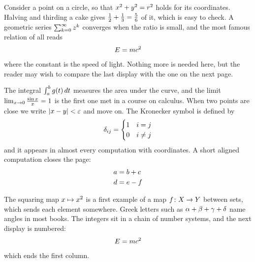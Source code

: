 \documentclass{article}
\newcommand*\pdfcraftbegin[1]{\special{pdfcraft:eq:#1:begin}}
\newcommand*\pdfcraftend[1]{\special{pdfcraft:eq:#1:end}}
\begin{document}
\onecolumn
Consider a point on a circle, so that $\pdfcraftbegin{sup_squares@onecol_a}
x^2 + y^2 = r^2
\pdfcraftend{sup_squares@onecol_a}$ holds for its coordinates. Halving and
thirding a cake gives $\pdfcraftbegin{frac_text_style@onecol_a}
\frac{1}{2} + \frac{1}{3} = \frac{5}{6}
\pdfcraftend{frac_text_style@onecol_a}$ of it, which is easy to check. A geometric series
$\pdfcraftbegin{sum_inline@onecol_a}
\sum_{k=0}^{\infty} z^k
\pdfcraftend{sum_inline@onecol_a}$ converges when the ratio is small, and the most famous relation of all reads
\begin{equation}\pdfcraftbegin{equation_numbered@onecol_a}
E = mc^2
\pdfcraftend{equation_numbered@onecol_a}\end{equation}
where the constant is the speed of light. Nothing more is needed here, but the reader may wish
to compare the last display with the one on the next page.

\clearpage
\onecolumn
The integral $\pdfcraftbegin{int_inline@onecol_b}
\int_a^b g(t)\,dt
\pdfcraftend{int_inline@onecol_b}$ measures the area under the curve, and the limit
$\pdfcraftbegin{lim_inline@onecol_b}
\lim_{x \to 0} \frac{\sin x}{x} = 1
\pdfcraftend{lim_inline@onecol_b}$ is the first one met in a course on calculus. When two points are close we write
$\pdfcraftbegin{abs_epsilon@onecol_b}
|x - y| < \varepsilon
\pdfcraftend{abs_epsilon@onecol_b}$ and move on. The Kronecker symbol is defined by
\begin{equation}\pdfcraftbegin{cases_numbered@onecol_b}
\delta_{ij} = \begin{cases} 1 & i = j \\ 0 & i \ne j \end{cases}
\pdfcraftend{cases_numbered@onecol_b}\end{equation}
and it appears in almost every computation with coordinates. A short aligned computation
closes the page:
\begin{align}\pdfcraftbegin{align_two@onecol_b}
a &= b + c \\ d &= e - f
\pdfcraftend{align_two@onecol_b}\end{align}

\clearpage
\twocolumn
The squaring map $\pdfcraftbegin{mapsto@twocol_a}
x \mapsto x^2
\pdfcraftend{mapsto@twocol_a}$ is a first example of a map $\pdfcraftbegin{arrow_map@twocol_a}
f\colon X \to Y
\pdfcraftend{arrow_map@twocol_a}$ between sets, which
sends each element somewhere. Greek letters such as $\pdfcraftbegin{greek_lower@twocol_a}
\alpha + \beta + \gamma + \delta
\pdfcraftend{greek_lower@twocol_a}$ name angles in most books. The integers sit
in a chain of number systems, and the next display is numbered:
\begin{equation}\pdfcraftbegin{equation_numbered@twocol_a}
E = mc^2
\pdfcraftend{equation_numbered@twocol_a}\end{equation}
which ends the first column.
\newpage
\end{document}
